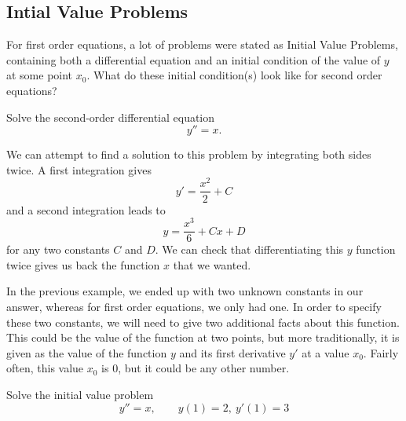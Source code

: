 \documentclass{ximera}
\begin{document}
\subsection{Intial Value Problems}

For first order equations, a lot of problems were stated as Initial Value Problems, containing both a differential equation and an initial condition of the value of $y$ at some point $x_0$. What do these initial condition(s) look like for second order equations?

\begin{example}
    Solve the second-order differential equation
    \begin{equation*}
        y'' = x.
    \end{equation*}
\end{example}

\begin{exampleSol}
    We can attempt to find a solution to this problem by integrating both sides twice. A first integration gives
    \begin{equation*}
        y' = \frac{x^2}{2} + C
    \end{equation*}
    and a second integration leads to 
    \begin{equation*}
        y = \frac{x^3}{6} + Cx + D
    \end{equation*}
    for any two constants $C$ and $D$. We can check that differentiating this $y$ function twice gives us back the function $x$ that we wanted.
\end{exampleSol}

In the previous example, we ended up with two unknown constants in our answer, whereas for first order equations, we only had one. In order to specify these two constants, we will need to give two additional facts about this function. This could be the value of the function at two points, but more traditionally, it is given as the value of the function $y$ and its first derivative $y'$ at a value $x_0$. Fairly often, this value $x_0$ is $0$, but it could be any other number.

\begin{example}
    Solve the initial value problem
    \begin{equation*}
        y'' = x, \qquad y(1) = 2,\ y'(1) = 3
    \end{equation*}
\end{example}
\end{document}
